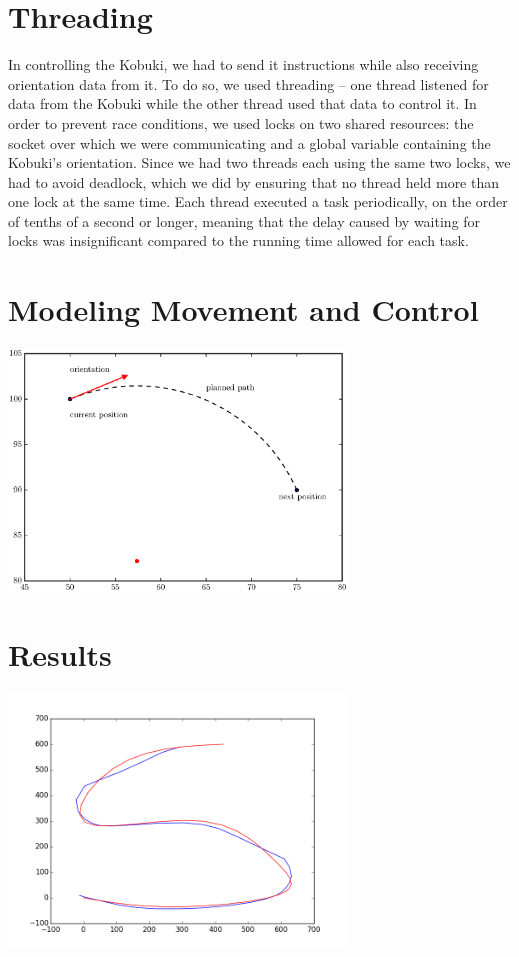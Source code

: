 \documentclass[10pt]{article}
\newenvironment{Figure}
  {\par\medskip\noindent\minipage{\linewidth}}
  {\endminipage\par\medskip}
\begin{document}
\begin{multicols}{2}
  \section*{Threading}
  In controlling the Kobuki, we had to send it instructions while also receiving
  orientation data from it. To do so, we used threading -- one thread listened
  for data from the Kobuki while the other thread used that data to control it.
  In order to prevent race conditions, we used locks on two shared resources:
  the socket over which we were communicating and a global variable containing
  the Kobuki's orientation. Since we had two threads each using the same two
  locks, we had to avoid deadlock, which we did by ensuring that no thread held
  more than one lock at the same time. Each thread executed a task periodically,
  on the order of tenths of a second or longer, meaning that the delay caused by
  waiting for locks was insignificant compared to the running time allowed for
  each task.

  \section*{Modeling Movement and Control}
  \begin{Figure}
    \includegraphics[width=9cm]{../plots/roc.eps}
     \label{fig:roc}
  \end{Figure}

  \section*{Results}
  \begin{Figure}
    \includegraphics[width=9cm]{../plots/s_plot.png}
     \label{fig:s_plot}
  \end{Figure}
\end{multicols}


\end{document}
